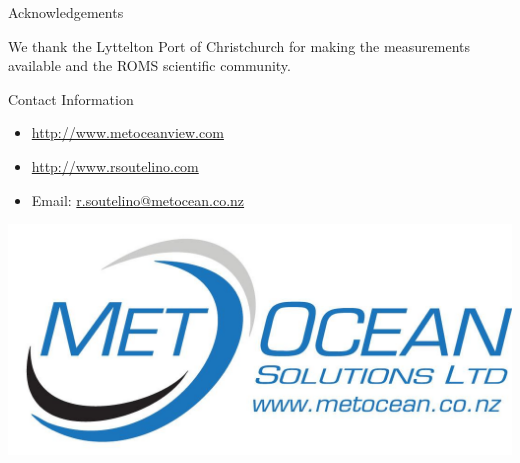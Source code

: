 \documentclass[final]{beamer}
\newlength{\onecolwid}
\begin{document}
\begin{frame}[t]
\begin{columns}[t]
\begin{column}{\onecolwid}



    \begin{block}{Acknowledgements}

    \small{We thank the Lyttelton Port of Christchurch for making the measurements available and the ROMS scientific community. } \\

    \end{block}



    \begin{block}{Contact Information}

    \begin{small}
    \begin{itemize}
    \item \href{http://www.metoceanview.com}{http://www.metoceanview.com}
    \item \href{http://www.rsoutelino.com}{http://www.rsoutelino.com}
    \item Email: \href{mailto:r.soutelino@metocean.co.nz}{r.soutelino@metocean.co.nz}
    \end{itemize}
    \end{small}

    \end{block}

    \vspace{3.2cm}

    \begin{center}
    \includegraphics[width=0.7\linewidth]{msllogo.jpg}
    \end{center}


\end{column}
\end{columns}
\end{frame}
\end{document}
